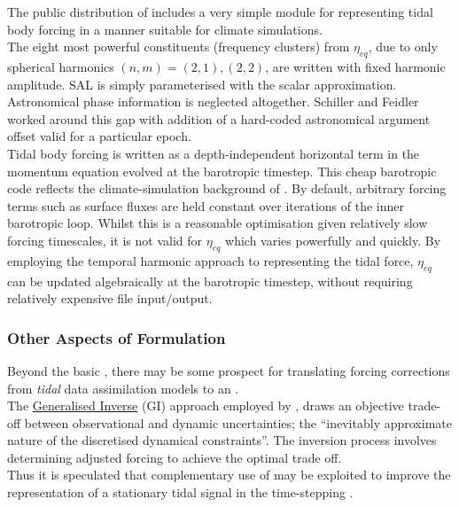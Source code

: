 The public distribution of \MOM{} includes a very simple module for representing tidal body forcing in a manner suitable for climate simulations\cite[pp263] {Griffies:2008vh}.\\
The eight most powerful constituents (frequency clusters) from $\eta_{eq}$, due to only spherical harmonics $(n,m) = (2,1) , (2,2)$, are written with fixed harmonic amplitude.  SAL is simply parameterised with the scalar approximation. \\
Astronomical phase information is neglected altogether.
Schiller and Feidler \citep{Schiller:2007gk} worked around this gap with addition of a hard-coded astronomical argument offset valid for a particular epoch.\\
Tidal body forcing is written as a depth-independent horizontal term in the momentum equation evolved at the barotropic timestep.
This cheap barotropic code reflects the climate-simulation background of \MOM{}.  
By default, arbitrary forcing terms such as surface fluxes are held constant over iterations of the inner barotropic loop.  
Whilst this is a reasonable optimisation given relatively slow forcing timescales, it is not valid for $\eta_{eq}$ which varies powerfully and quickly.
By employing the temporal harmonic approach to representing the tidal force, $\eta_{eq}$ can be updated algebraically at the barotropic timestep, without requiring relatively expensive file input/output.\\




\subsubsection{Other Aspects of Formulation}
Beyond the basic \ATGP{}, there may be some prospect for translating forcing corrections from \emph{tidal} data assimilation models to an \OGCM{}. \\
The \underline{Generalised Inverse} (GI) \cite[pp345] {Zaron:2011ft} approach employed by \OTIS{} \cite{Egbert:2002ug}, draws an objective trade-off between observational and dynamic uncertainties; the ``inevitably approximate nature of the discretised dynamical constraints''\cite[pp155]{Egbert:1996vr}.  The inversion process involves determining adjusted forcing to achieve the optimal trade off.\\
Thus it is speculated that complementary use of \OTIS{} may be exploited to improve the representation of a stationary tidal signal in the time-stepping \OGCM{}.  \\


